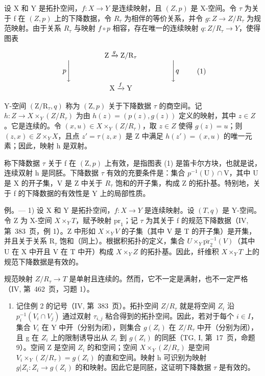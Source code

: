 设 X 和 Y 是拓扑空间，\(f: X \to Y\) 是连续映射，且 \((Z, p)\) 是 X-空间。令 \(\tau\) 为关于 f 在 \((Z, p)\) 上的下降数据，令 \(R_{\tau}\) 为相伴的等价关系，并令 \(g: Z \to Z/R_{\tau}\) 为规范映射。由于关系 \(R_{\tau}\) 与映射 \(f \circ p\) 相容，存在唯一的连续映射 \(q: Z/R_{\tau} \to Y\)，使得图表

\[
\begin{array}{c} \mathrm{Z} \xrightarrow {g} \mathrm{Z} / \mathrm{R} _ {\tau} \\ p \Biggl \downarrow \qquad \qquad \qquad \qquad \qquad \qquad \qquad \Biggl \downarrow q \\ \mathrm{X} \xrightarrow {f} \mathrm{Y} \end{array}\tag{1}
\]

Y-空间 \((\mathrm{Z}/\mathrm{R}_{\tau}, q)\) 称为 \((\mathrm{Z}, p)\) 关于下降数据 \(\tau\) 的商空间。记 \(h: Z \to X \times_{Y} (Z/R_{\tau})\) 为由 \(h(z) = (p(z), g(z))\) 定义的映射，其中 \(z \in Z\)。它是连续的。令 \((x, u) \in X \times_{Y} (Z/R_{\tau})\)，取 \(z \in Z\) 使得 \(g(z) = u\)；则 \((z, x) \in Z \times_{Y} X\)，且点 \(z' = \tau(z, x)\) 是 Z 中满足 \(h(z') = (x, u)\) 的唯一元素；因此，映射 h 是双射。

称下降数据 \(\tau\) 关于 f 在 \((\mathrm{Z},p)\) 上有效，是指图表 (1) 是笛卡尔方块，也就是说，连续双射 h 是同胚。下降数据 \(\tau\) 有效的充要条件是：集合 \(p^{-1}(\mathrm{U})\cap \mathrm{V}\)，其中 U 是 X 的开子集，V 是 Z 中关于 \(R_{\tau}\) 饱和的开子集，构成 Z 的拓扑基。特别地，关于 f 的下降数据的有效性是 Y 上的局部性质。

例。--- 1) 设 X 和 Y 是拓扑空间，\(f\colon X\to Y\) 是连续映射。设 \((T,q)\) 是 Y-空间。令 Z 为 X-空间 \(X\times_Y T\)，赋予映射 \(\mathrm{pr}_{1}\)；记 \(\tau\) 为其关于 f 的规范下降数据（IV, 第~383~页，例 1）。Z 中形如 \(X\times_Y V\) 的子集（其中 V 是 T 的开子集）是开集，并且关于关系 \(\mathrm{R}_{\tau}\) 饱和（同上）。根据积拓扑的定义，集合 \(U\times_Y\overline{\mathrm{pr}}_{2}^{-1}(V)\)（其中 U 在 X 中开且 V 在 T 中开）构成 \(X\times_Y Z\) 的拓扑基。因此，纤维积 \(X\times_Y T\) 上的规范下降数据是有效的。

规范映射 \(Z/R_{\tau} \rightarrow T\) 是单射且连续的。然而，它不一定是满射，也不一定严格（IV, 第~462~页，习题 1）。

\begin{enumerate}
\def\labelenumi{\arabic{enumi})}
\setcounter{enumi}{1}
\tightlist
\item
  记住例 2 的记号（IV, 第~383~页）。拓扑空间 \(Z/R_{\tau}\) 就是将空间 \(Z_{i}\) 沿 \(p_{i}^{-1}(V_{i} \cap V_{j})\) 通过双射 \(\tau_{i,j}\) 粘合得到的拓扑空间。因此，若对于每个 \(i \in I\)，集合 \(V_{i}\) 在 Y 中开（分别为闭），则集合 \(g(Z_{i})\) 在 \(Z/R_{\tau}\) 中开（分别为闭），且 g 在 \(Z_{i}\) 上的限制诱导出从 \(Z_{i}\) 到 \(g(Z_{i})\) 的同胚（TG, I, 第~17~页，命题 9）。空间 Z 是空间 \(Z_{i}\) 的和空间；空间 \(X \times_{Y}(Z/R_{\tau})\) 是空间 \(V_{i} \times_{Y}(Z/R_{\tau}) = g(Z_{i})\) 的直和空间。映射 h 可识别为映射 \(g|Z_{i}: Z_{i} \to g(Z_{i})\) 的和映射。因此它是同胚，这证明下降数据 \(\tau\) 是有效的。
\end{enumerate}

